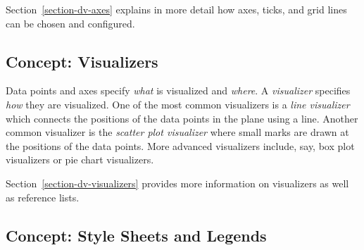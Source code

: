 Section~\ref{section-dv-axes} explains in more detail how axes, ticks, and grid
lines can be chosen and configured.


\subsection{Concept: Visualizers}

Data points and axes specify \emph{what} is visualized and \emph{where}. A
\emph{visualizer} specifies \emph{how} they are visualized. One of the most
common visualizers is a \emph{line visualizer} which connects the positions of
the data points in the plane using a line. Another common visualizer is the
\emph{scatter plot visualizer} where small marks are drawn at the positions of
the data points. More advanced visualizers include, say, box plot visualizers
or pie chart visualizers.
%
\begin{codeexample}[]
\end{codeexample}
%
\begin{codeexample}[]
\end{codeexample}

Section~\ref{section-dv-visualizers} provides more information on visualizers
as well as reference lists.


\subsection{Concept: Style Sheets and Legends}

